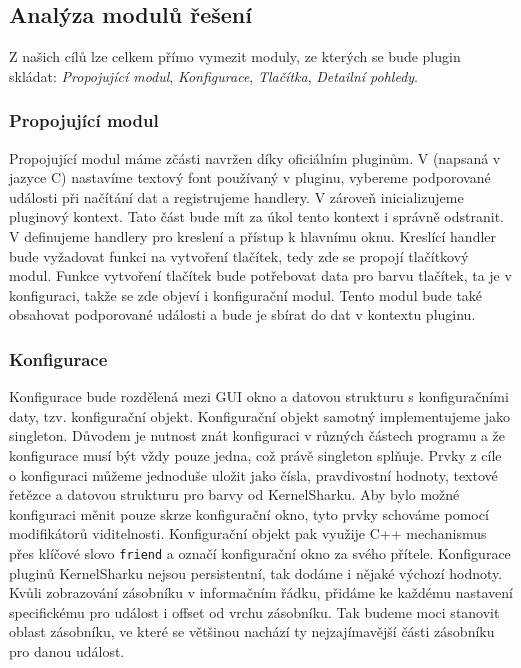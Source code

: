 \subsection{Analýza modulů řešení}
Z našich cílů lze celkem přímo vymezit moduly, ze kterých se bude plugin skládat: \emph{Propojující modul}, \emph{Konfigurace}, \emph{Tlačítka}, \emph{Detailní pohledy}.

\subsubsection{Propojující modul}
Propojující modul máme zčásti navržen díky oficiálním pluginům. V  (napsaná v jazyce C) nastavíme textový font používaný v pluginu, vybereme podporované události při načítání dat a registrujeme handlery. V  zároveň inicializujeme pluginový kontext. Tato část bude mít za úkol tento kontext i správně odstranit. V  definujeme handlery pro kreslení a přístup k hlavnímu oknu. Kreslící handler bude vyžadovat funkci na vytvoření tlačítek, tedy zde se propojí tlačítkový modul. Funkce vytvoření tlačítek bude potřebovat data pro barvu tlačítek, ta je v konfiguraci, takže se zde objeví i konfigurační modul. Tento modul bude také obsahovat podporované události a bude je sbírat do dat v kontextu pluginu.

\subsubsection{Konfigurace}
Konfigurace bude rozdělená mezi GUI okno a datovou strukturu s konfiguračními daty, tzv. konfigurační objekt. Konfigurační objekt samotný implementujeme jako singleton. Důvodem je nutnost znát konfiguraci v různých částech programu a že konfigurace musí být vždy pouze jedna, což právě singleton splňuje. Prvky z cíle o konfiguraci můžeme jednoduše uložit jako čísla, pravdivostní hodnoty, textové řetězce a datovou strukturu pro barvy od KernelSharku. Aby bylo možné konfiguraci měnit pouze skrze konfigurační okno, tyto prvky schováme pomocí modifikátorů viditelnosti. Konfigurační objekt pak využije C++ mechanismus  přes klíčové slovo \texttt{friend} a označí konfigurační okno za svého přítele. Konfigurace pluginů KernelSharku nejsou persistentní, tak dodáme i nějaké výchozí hodnoty. Kvůli zobrazování zásobníku v informačním řádku, přidáme ke každému nastavení specifickému pro událost i offset od vrchu zásobníku. Tak budeme moci stanovit oblast zásobníku, ve které se většinou nachází ty nejzajímavější části zásobníku pro danou událost.


